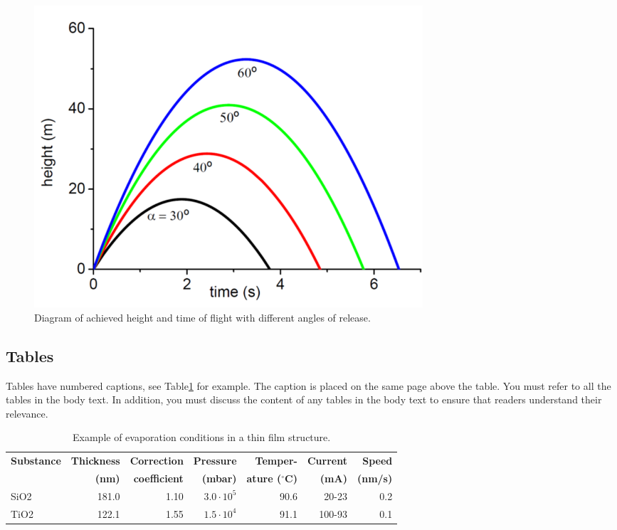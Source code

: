 
\begin{figure}[t]
  \begin{center}
    \includegraphics[width=0.7\textwidth]{figure}
  \end{center}
  \caption{Diagram of achieved height and time of flight with different angles of release.}
  \label{fig:ex_fig}
\end{figure}


\subsection{Tables}

Tables have numbered captions, see Table\ref{tab:thin_film} for
example. The caption is placed on the same page above the table. You 
must refer to all the tables in the body text. In addition, you must 
discuss the content of any tables in the body text to ensure that readers 
understand their relevance.

\begin{table}[ht]
  \small
  \begin{center}
    \caption{Example of evaporation conditions in a thin film structure.}
    \label{tab:thin_film}
    \begin{tabular}{l | r r r r r r}
      \hline
      \textbf{Substance} & \textbf{Thickness}& \textbf{Correction } & \textbf{Pressure} & \textbf{Temper-}          & \textbf{Current} & \textbf{Speed} \\
                         & \textbf{(nm)}     & \textbf{coefficient} & \textbf{(mbar)}   & \textbf{ature ($^\circ$C)} & \textbf{(mA)}    & \textbf{(nm/s)} \\
      \hline 
      SiO2	& 181.0	& 1.10	& $3.0\cdot10^5$	& 90.6	& 20-23	 &0.2 \\
      TiO2	& 122.1	& 1.55	& $1.5\cdot10^4$	& 91.1	& 100-93 &0.1 \\
      \hline
    \end{tabular}
  \end{center}
\end{table}


